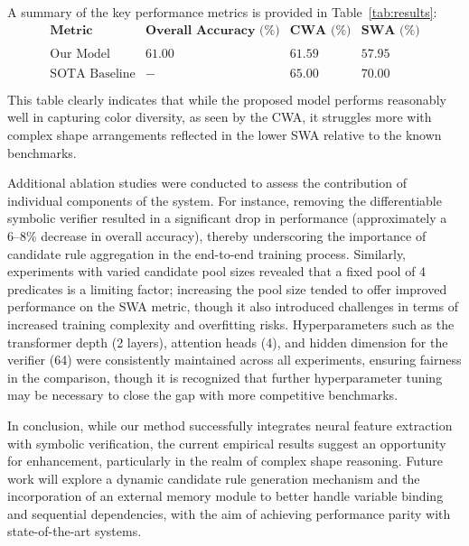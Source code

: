 \documentclass{article}
\begin{document}
A summary of the key performance metrics is provided in Table~\ref{tab:results}:
\[
\begin{array}{lccc}
\textbf{Metric} & \textbf{Overall Accuracy (\%)} & \textbf{CWA (\%)} & \textbf{SWA (\%)} \\\\
\hline
\text{Our Model} & 61.00 & 61.59 & 57.95 \\\\
\text{SOTA Baseline} & - & 65.00 & 70.00 \\\\
\end{array}
\]
This table clearly indicates that while the proposed model performs reasonably well in capturing color diversity, as seen by the CWA, it struggles more with complex shape arrangements reflected in the lower SWA relative to the known benchmarks.

Additional ablation studies were conducted to assess the contribution of individual components of the system. For instance, removing the differentiable symbolic verifier resulted in a significant drop in performance (approximately a 6–8\% decrease in overall accuracy), thereby underscoring the importance of candidate rule aggregation in the end-to-end training process. Similarly, experiments with varied candidate pool sizes revealed that a fixed pool of 4 predicates is a limiting factor; increasing the pool size tended to offer improved performance on the SWA metric, though it also introduced challenges in terms of increased training complexity and overfitting risks. Hyperparameters such as the transformer depth (2 layers), attention heads (4), and hidden dimension for the verifier (64) were consistently maintained across all experiments, ensuring fairness in the comparison, though it is recognized that further hyperparameter tuning may be necessary to close the gap with more competitive benchmarks.

In conclusion, while our method successfully integrates neural feature extraction with symbolic verification, the current empirical results suggest an opportunity for enhancement, particularly in the realm of complex shape reasoning. Future work will explore a dynamic candidate rule generation mechanism and the incorporation of an external memory module to better handle variable binding and sequential dependencies, with the aim of achieving performance parity with state-of-the-art systems.
\end{document}

